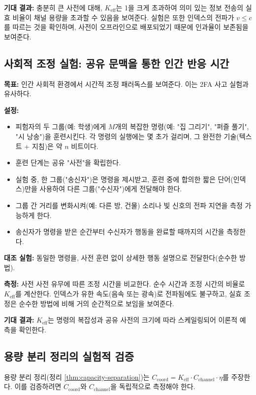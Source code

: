 \documentclass[12pt,a4paper]{article}
\begin{document}
	\textbf{기대 결과:} 충분히 큰 사전에 대해, \(K_{\mathrm{eff}}\)는 1을 크게 초과하여 의미 있는 정보 전송의 실효 비율이 채널 용량을 초과할 수 있음을 보여준다. 실험은 또한 인덱스의 전파가 \(v \le c\)를 따르는 것을 확인하며, 사전이 오프라인으로 배포되었기 때문에 인과율이 보존됨을 보여준다.
	
	\subsection{사회적 조정 실험: 공유 문맥을 통한 인간 반응 시간}
	\label{subsec:social-experiment}
	
	\textbf{목표:} 인간 사회적 환경에서 시간적 조정 패러독스를 보여준다. 이는 2FA 사고 실험과 유사하다.
	
	\textbf{설정:}
	\begin{itemize}
		\item 피험자의 두 그룹(예: 학생)에게 \(M\)개의 복잡한 명령(예: "집 그리기", "퍼즐 풀기", "시 낭송")을 훈련시킨다. 각 명령의 실행에는 몇 초가 걸리며, 그 완전한 기술(텍스트 + 지침)은 약 \(n\) 비트이다.
		\item 훈련 단계는 공유 "사전"을 확립한다.
		\item 실험 중, 한 그룹("송신자")은 명령을 제시받고, 훈련 중에 합의한 짧은 단어(인덱스)만을 사용하여 다른 그룹("수신자")에게 전달해야 한다.
		\item 그룹 간 거리를 변화시켜(예: 다른 방, 건물) 소리나 빛 신호의 전파 지연을 측정 가능하게 한다.
		\item 송신자가 명령을 받은 순간부터 수신자가 행동을 완료할 때까지의 시간을 측정한다.
	\end{itemize}
	
	\textbf{대조 실험:} 동일한 명령을, 사전 훈련 없이 상세한 행동 설명으로 전달한다(순수한 방법).
	
	\textbf{측정:} 사전 사전 유무에 따른 조정 시간을 비교한다. 순수 시간과 조정 시간의 비율로 \(K_{\mathrm{eff}}\)를 계산한다. 인덱스가 유한 속도(음속 또는 광속)로 전파됨에도 불구하고, 실효 조정은 순수한 방법에 비해 거의 순간적으로 보임을 보여준다.
	
	\textbf{기대 결과:} \(K_{\mathrm{eff}}\)는 명령의 복잡성과 공유 사전의 크기에 따라 스케일링되어 이론적 예측을 확인한다.
	
	\subsection{용량 분리 정리의 실험적 검증}
	\label{subsec:capacity-theorem}
	
	용량 분리 정리(정리 \ref{thm:capacity-separation})는 \(C_{\text{coord}} = K_{\mathrm{eff}} \cdot C_{\text{channel}} \cdot \eta\)를 주장한다. 이를 검증하려면 \(C_{\text{coord}}\)와 \(C_{\text{channel}}\)을 독립적으로 측정해야 한다.
	
\end{document}
